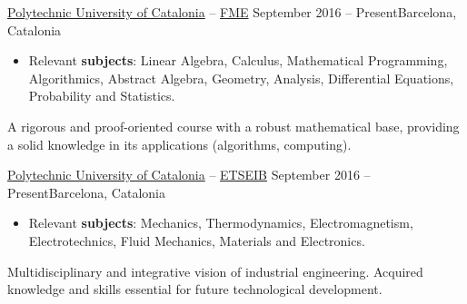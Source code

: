 \documentclass[10pt, a4paper, ragged2e]{altacv}
\begin{document}

\begin{adjustwidth}{0pt}{-10pt}
  \begin{fullwidth}
    \makecvheader
  \end{fullwidth}
\end{adjustwidth}

\medskip
{}

{\href{https://www.upc.edu/en}{Polytechnic University of Catalonia} --
  \href{https://fme.upc.edu/en}{FME}}
{September 2016 -- Present}{Barcelona, Catalonia}
\begin{itemize}
  \item Relevant \textbf{subjects}: Linear Algebra, Calculus, Mathematical
  Programming, Algorithmics, Abstract Algebra, Geometry, Analysis, Differential
  Equations, Probability and Statistics.
\end{itemize}
A rigorous and proof-oriented course with a robust mathematical base, providing
a solid knowledge in its applications (algorithms, computing).

\divider

{\href{https://www.upc.edu/en}{Polytechnic University of Catalonia} --
\href{https://etseib.upc.edu/en}{ETSEIB}}
{September 2016 -- Present}{Barcelona, Catalonia}
\begin{itemize}
  \item Relevant \textbf{subjects}: Mechanics, Thermodynamics, Electromagnetism,
  Electrotechnics, Fluid Mechanics, Materials and Electronics.
\end{itemize}
Multidisciplinary and integrative vision of industrial engineering. Acquired
knowledge and skills essential for future technological development.
\end{document}
